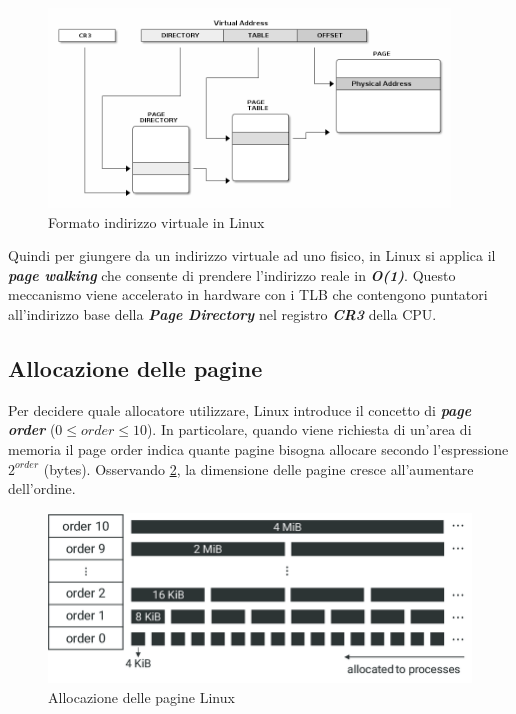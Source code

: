 \documentclass{article}
\begin{document}
\begin{figure}[h]
  \begin{center}
    \includegraphics[width=0.95\textwidth]{figures/ch1/linux_va.png}
  \end{center}
  \caption{Formato indirizzo virtuale in Linux}\label{fig:linux_va}
\end{figure}

Quindi per giungere da un indirizzo virtuale ad uno fisico, in Linux si applica il 
\textbf{\textit{page walking}} che consente di prendere l'indirizzo reale in \textbf{\textit{O(1)}}. 
Questo meccanismo viene accelerato in hardware con i TLB che contengono puntatori all'indirizzo 
base della \textbf{\textit{Page Directory}} nel registro \textbf{\textit{CR3}} della CPU.

\subsection{Allocazione delle pagine}
Per decidere quale allocatore utilizzare, Linux introduce il concetto di \textbf{\textit{page order}} 
($0 \leq order \leq 10$). In particolare, quando viene richiesta di un'area di memoria il 
page order indica quante pagine bisogna allocare secondo l'espressione $2^{order}$ (bytes). 
Osservando \cref{fig:order}, la dimensione delle 
pagine cresce all'aumentare dell'ordine.

\begin{figure}[h]
  \begin{center}
    \includegraphics[width=.75\textwidth]{figures/ch1/Memory-management-in-Linux-via-the-buddy-allocator-algorithm-Memory-spaces-are-divided.png}
  \end{center}
  \caption{Allocazione delle pagine Linux}\label{fig:order}
\end{figure}
\end{document}

